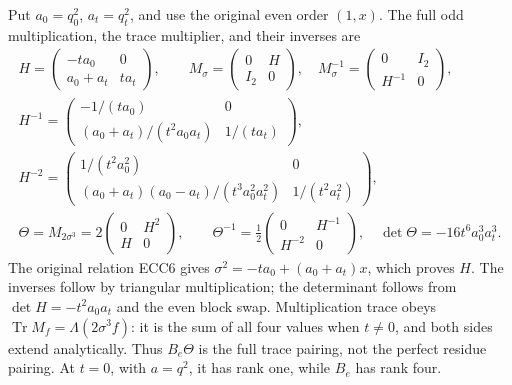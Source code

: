 \documentclass[11pt]{article}
\providecommand{\Tr}{\operatorname{Tr}}
\providecommand{\Tr}{\operatorname{Tr}}
\begin{document}
Put $a_0=q_0^2$, $a_t=q_t^2$, and use the original even order $(1,x)$.
The full odd multiplication, the trace multiplier, and their inverses are
\begin{equation}
 \begin{gathered}
 H=\begin{pmatrix}-ta_0&0\\a_0+a_t&ta_t\end{pmatrix},\qquad
 M_\sigma=\begin{pmatrix}0&H\\I_2&0\end{pmatrix},\quad
 M_\sigma^{-1}=\begin{pmatrix}0&I_2\\H^{-1}&0\end{pmatrix},\\
 H^{-1}=\begin{pmatrix}-1/(ta_0)&0\\
 (a_0+a_t)/(t^2a_0a_t)&1/(ta_t)\end{pmatrix},\\
 H^{-2}=\begin{pmatrix}1/(t^2a_0^2)&0\\
 (a_0+a_t)(a_0-a_t)/(t^3a_0^2a_t^2)&1/(t^2a_t^2)\end{pmatrix},\\
 \Theta=M_{2\sigma^3}=2\begin{pmatrix}0&H^2\\H&0\end{pmatrix},\qquad
 \Theta^{-1}=\frac12\begin{pmatrix}0&H^{-1}\\H^{-2}&0\end{pmatrix},\quad
 \det\Theta=-16t^6a_0^3a_t^3.
 \end{gathered}\tag{ECC21}
\end{equation}
The original relation ECC6 gives $\sigma^2=-ta_0+(a_0+a_t)x$,
which proves $H$. The inverses follow by triangular multiplication;
the determinant follows from $\det H=-t^2a_0a_t$ and the even block swap.
Multiplication trace obeys $\Tr M_f=\Lambda(2\sigma^3f)$: it is the sum
of all four values when $t\ne0$, and both sides extend analytically.
Thus $B_e\Theta$ is the full trace pairing, not the perfect residue
pairing. At $t=0$, with $a=q^2$, it has rank one, while $B_e$ has rank four.
\end{document}
